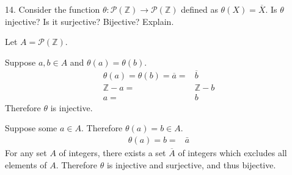 \documentclass{hippoidC}
\begin{document}
\begin{prooflist}{14. Consider the function $\theta: \mathscr{P}(\mathbb{Z})
			\rightarrow \mathscr{P}(\mathbb{Z})$ defined as $\theta(X)=\overline{X}$. Is
		$\theta$ injective? Is it surjective? Bijective? Explain.}
	\item Let $A=\mathscr{P}(\mathbb{Z})$.
	\inj{}
	\item Suppose $a, b \in A$ and $\theta(a)=\theta(b)$.
	\begin{align*}
		\theta(a)=\theta(b)=\overline{a} = & \overline{b}  \\
		\mathbb{Z} - a =                   & \mathbb{Z} -b \\
		a =                                & b
	\end{align*}
	Therefore $\theta$ is injective.
	\surj{}
	\item Suppose some $a\in A$. Therefore $\theta(a)=b\in A$.
	\begin{align*}
		\theta(a)=b= & \bar{a}
	\end{align*}
	For any set $A$ of integers, there exists a set $\overline{A}$ of integers which excludes all
	elements of $A$. Therefore $\theta$ is injective and surjective, and thus
	bijective.
\end{prooflist}
\end{document}
